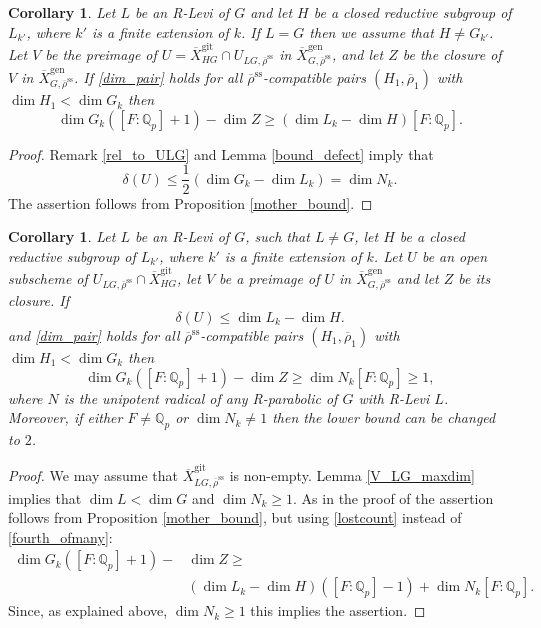 \documentclass{amsart}
\newtheorem{cor}[prop]{Corollary}
\theoremstyle{definition}
\theoremstyle{remark}
\newcommand{\Qp}{\mathbb {Q}_p}
\newcommand{\rhobar}{\overline{\rho}}
\newcommand{\gen}{\mathrm{gen}}
\newcommand{\gps}{\mathrm{git}}
\newcommand{\Xbar}{\overline{X}}
\newcommand{\rhobarss}{\rhobar^{\mathrm{ss}}}
\begin{document}
\begin{cor}\label{bound_1} Let $L$ be an R-Levi of $G$ and let $H$ be a closed reductive subgroup of $L_{k'}$, where 
$k'$ is a finite extension of $k$. If $L=G$ then we assume that $H\neq G_{k'}$. 
Let $V$ be the preimage of $U=\Xbar^{\gps}_{HG}\cap U_{LG, \rhobarss}$ in $\Xbar^{\gen}_{G, \rhobarss}$, and let $Z$ be the closure of $V$ in $\Xbar^{\gen}_{G, \rhobarss}$. 
If \eqref{dim_pair} holds for all $\rhobarss$-compatible pairs $(H_1, \rhobar_1)$ with $\dim H_1< \dim G_k$ then
$$\dim G_k ([F:\Qp]+1) - \dim Z\ge (\dim L_k - \dim H)[F:\Qp].$$
\end{cor}
\begin{proof} Remark \ref{rel_to_ULG} and Lemma \ref{bound_defect} imply that 
\begin{equation}\label{fourth_ofmany} 
 \delta(U) \le \frac{1}{2}(\dim G_k - \dim L_k) =\dim N_k.
\end{equation}
The assertion follows from Proposition \ref{mother_bound}.
\end{proof} 

\begin{cor}\label{bound_2} Let $L$ be an R-Levi of $G$, such that $L\neq G$, 
let $H$ be a closed reductive subgroup of $L_{k'}$, where 
$k'$ is a finite extension of $k$. Let $U$ be an open subscheme of $U_{LG, \rhobarss}\cap \Xbar^{\gps}_{HG}$, 
let $V$ be a preimage of $U$ in $\Xbar^{\gen}_{G, \rhobarss}$ and let $Z$ be its closure. 
If \begin{equation}\label{lostcount} 
 \delta(U) \le \dim L_k -\dim H.
\end{equation} and
\eqref{dim_pair} holds for all $\rhobarss$-compatible pairs $(H_1, \rhobar_1)$ with $\dim H_1< \dim G_k$ then
$$\dim G_k ([F:\Qp]+1) - \dim Z\ge \dim N_k [F:\Qp]\ge 1,$$
where $N$ is the unipotent radical of any R-parabolic of $G$ with R-Levi $L$. Moreover, 
if either $F\neq \Qp$ or $\dim N_k \neq 1$ then the lower bound can be changed to $2$. 
\end{cor}
\begin{proof} 
We may assume that $\Xbar^{\gps}_{LG, \rhobarss}$ is non-empty. Lemma \ref{V_LG_maxdim} implies that $\dim L< \dim G$ and $\dim N_k \ge 1$. 
As in the proof of  the assertion follows from Proposition \ref{mother_bound}, but using \eqref{lostcount} instead of  
  \eqref{fourth_ofmany}: 
\begin{equation}\begin{split}
\dim G_k ([F:\Qp]+1) -&\dim Z \ge \\&(\dim L_k - \dim H)([F:\Qp]-1) + \dim N_k[F:\Qp].
\end{split}
\end{equation}
Since, as explained above, $\dim N_k \ge 1$ this implies the assertion.
\end{proof}
\end{document}
